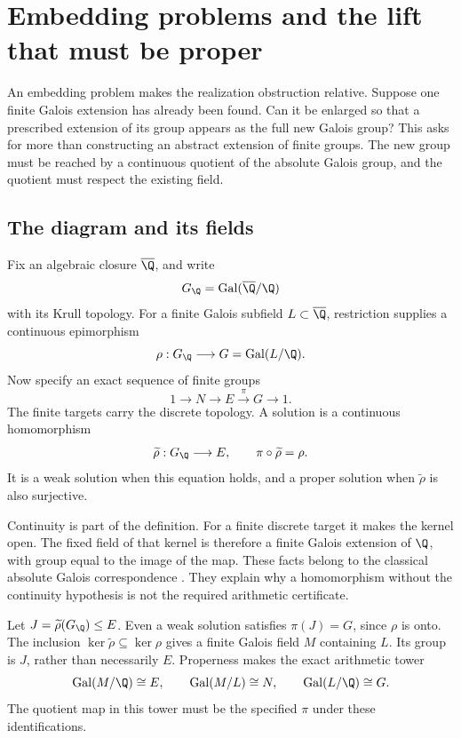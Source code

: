 \chapter{Embedding problems and the lift that must be proper}
\label{ch:embedding-problems}

An embedding problem makes the realization obstruction relative. Suppose one finite Galois extension has already been found. Can it be enlarged so that a prescribed extension of its group appears as the full new Galois group? This asks for more than constructing an abstract extension of finite groups. The new group must be reached by a continuous quotient of the absolute Galois group, and the quotient must respect the existing field.

\section{The diagram and its fields}

Fix an algebraic closure \(\overline\Q\), and write
\[
 G_{\Q}=\Gal(\overline\Q/\Q)
\]
with its Krull topology. For a finite Galois subfield \(L\subset\overline\Q\), restriction supplies a continuous epimorphism \cite[Proposition 7.7]{Milne2022}
\[
 \rho:G_{\Q}\longrightarrow G=\Gal(L/\Q).
\]
Now specify an exact sequence of finite groups
\begin{equation}
 1\longrightarrow N\longrightarrow E\overset{\pi}{\longrightarrow}G\longrightarrow1.
 \label{eq:b-group-extension}
\end{equation}
The finite targets carry the discrete topology. A solution is a continuous homomorphism
\begin{equation}
 \widetilde\rho:G_{\Q}\longrightarrow E,
 \qquad \pi\circ\widetilde\rho=\rho.
 \label{eq:b-lift-equation}
\end{equation}
It is a weak solution when this equation holds, and a proper solution when \(\widetilde\rho\) is also surjective.

Continuity is part of the definition. For a finite discrete target it makes the kernel open. The fixed field of that kernel is therefore a finite Galois extension of \(\Q\), with group equal to the image of the map. These facts belong to the classical absolute Galois correspondence \cite[Theorem 7.13]{Milne2022}. They explain why a homomorphism without the continuity hypothesis is not the required arithmetic certificate.

Let \(J=\widetilde\rho(G_{\Q})\leq E\). Even a weak solution satisfies \(\pi(J)=G\), since \(\rho\) is onto. The inclusion \(\ker\widetilde\rho\subseteq\ker\rho\) gives a finite Galois field \(M\) containing \(L\). Its group is \(J\), rather than necessarily \(E\). Properness makes the exact arithmetic tower
\[
 \Gal(M/\Q)\cong E,
 \qquad \Gal(M/L)\cong N,
 \qquad \Gal(L/\Q)\cong G.
\]
The quotient map in this tower must be the specified \(\pi\) under these identifications.

